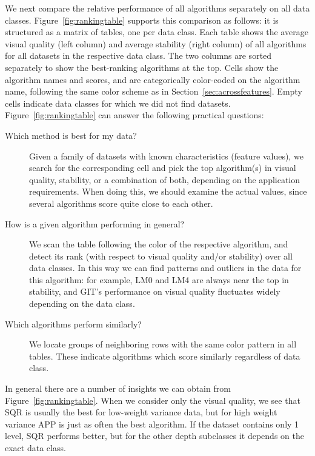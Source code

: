 We next compare the relative performance of all algorithms separately on all data classes. 
Figure~\ref{fig:rankingtable} supports this comparison as follows: it is structured as a matrix of tables, one per data class.
Each table shows the average visual quality (left column) and average stability (right column) of all algorithms for all datasets in the respective data class. The two columns are sorted separately to show the best-ranking algorithms at the top. Cells show the algorithm names and scores, and are categorically color-coded on the algorithm name, following the same color scheme as in Section~\ref{sec:acrossfeatures}. Empty cells indicate data classes for which we did not find datasets.
Figure~\ref{fig:rankingtable} can answer the following practical questions:
%
\begin{description}
\item[Which method is best for my data?] Given a family of datasets with known characteristics (feature values), we search for the corresponding cell and pick the top algorithm(s) in visual quality, stability, or a combination of both, depending on the application requirements. When doing this, we should examine the actual values, since several algorithms score quite close to each other.
\item[How is a given algorithm performing in general?] We scan the table following the color of the respective algorithm, and detect its rank (with respect to visual quality and/or stability) over all data classes. In this way we can find patterns and outliers in the data for this algorithm: for example, LM0 and LM4 are always near the top in stability, and GIT's performance on visual quality fluctuates widely depending on the data class.
\item[Which algorithms perform similarly?] We locate groups of neigh\-boring rows with the same color pattern in all tables. These indicate algorithms which score similarly regardless of data class.
\end{description}
%
In general there are a number of insights we can obtain from Figure~\ref{fig:rankingtable}. When we consider only the visual quality, we see that SQR is usually the best for low-weight variance data, but for high weight variance APP is just as often the best algorithm. If the dataset contains only 1 level, SQR performs better, but for the other depth subclasses it depends on the exact data class.
